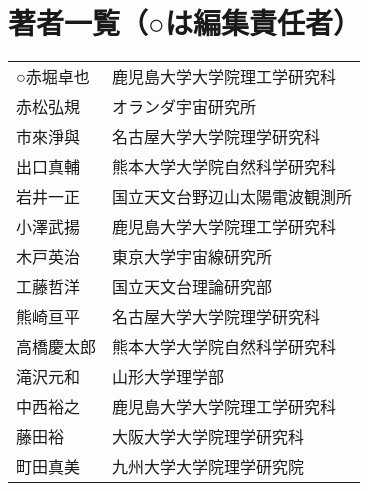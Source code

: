 \newpage
\section*{著者一覧（○は編集責任者）}

\begin{tabular}{ll}
○赤堀卓也 & 鹿児島大学大学院理工学研究科 \\
赤松弘規 & オランダ宇宙研究所 \\
市來淨與 & 名古屋大学大学院理学研究科 \\
出口真輔 & 熊本大学大学院自然科学研究科 \\
岩井一正 & 国立天文台野辺山太陽電波観測所 \\
小澤武揚 & 鹿児島大学大学院理工学研究科 \\
木戸英治 & 東京大学宇宙線研究所 \\
工藤哲洋 & 国立天文台理論研究部 \\
熊崎亘平 & 名古屋大学大学院理学研究科 \\
高橋慶太郎 & 熊本大学大学院自然科学研究科 \\
滝沢元和 & 山形大学理学部 \\
中西裕之 & 鹿児島大学大学院理工学研究科 \\
藤田裕 & 大阪大学大学院理学研究科 \\
町田真美 & 九州大学大学院理学研究院
\end{tabular}

